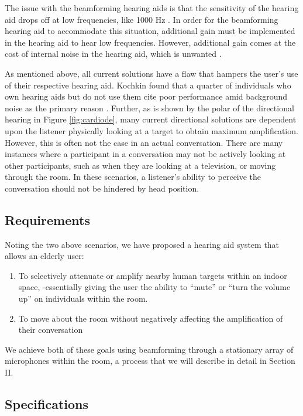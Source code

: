 \documentclass[10pt,journal,compsoc]{IEEEtran}
\begin{document}
The issue with the beamforming hearing aids is that the sensitivity of the hearing aid drops off at low frequencies, like 1000 Hz \cite{thompson} . In order for the beamforming hearing aid to accommodate this situation, additional gain must be implemented in the hearing aid to hear low frequencies. However, additional gain comes at the cost of internal noise in the hearing aid, which is unwanted \cite{thompson}.

As mentioned above, all current solutions have a flaw that hampers the user’s use of their respective hearing aid. Kochkin  found that a quarter of individuals who own hearing aids but do not use them cite poor performance amid background noise as the primary reason \cite{kochkin}.
Further, as is shown by the polar of the directional hearing in Figure \ref{fig:cardiode}, many current directional solutions are dependent upon the listener physically looking at a target to obtain maximum amplification. However, this is often not the case in an actual conversation. There are many instances where a participant in a conversation may not be actively looking at other participants, such as when they are looking at a television, or moving through the room. In these scenarios, a listener’s ability to perceive the conversation should not be hindered by head position.



\subsection{Requirements}

Noting the two above scenarios, we have proposed a hearing aid system that allows an elderly user:

\begin{enumerate}
    \item To selectively attenuate or amplify nearby human targets within an indoor space, -essentially giving the user the ability to “mute” or “turn the volume up” on individuals within the room.
    \item To move about the room without negatively affecting the amplification of their conversation
\end{enumerate}

We achieve both of these goals using beamforming through a stationary array of microphones within the room, a process that we will describe in detail in Section II.


\subsection{Specifications}
\end{document}
